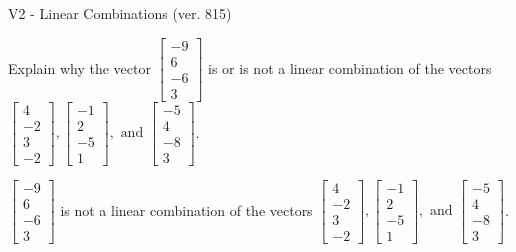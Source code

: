 \begin{exercise}
  \begin{exerciseTitle}V2 - Linear Combinations (ver. 815)\end{exerciseTitle}
  \begin{exerciseStatement}
    Explain why the vector \(\left[\begin{array}{c}
-9 \\
6 \\
-6 \\
3
\end{array}\right]\)  is or is not a linear 
	combination of the vectors \(\left[\begin{array}{c}
4 \\
-2 \\
3 \\
-2
\end{array}\right] , \left[\begin{array}{c}
-1 \\
2 \\
-5 \\
1
\end{array}\right] , \text{ and } \left[\begin{array}{c}
-5 \\
4 \\
-8 \\
3
\end{array}\right]\).
	


  \end{exerciseStatement}
  \begin{exerciseAnswer}
   \(\left[\begin{array}{c}
-9 \\
6 \\
-6 \\
3
\end{array}\right]\) 
  	 is not  
	a linear combination of the vectors \(\left[\begin{array}{c}
4 \\
-2 \\
3 \\
-2
\end{array}\right] , \left[\begin{array}{c}
-1 \\
2 \\
-5 \\
1
\end{array}\right] , \text{ and } \left[\begin{array}{c}
-5 \\
4 \\
-8 \\
3
\end{array}\right]\).

	
  


  \end{exerciseAnswer}
\end{exercise}
